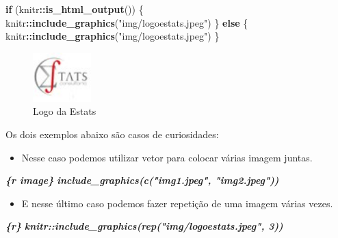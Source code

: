 \documentclass[
]{book}
\newenvironment{Shaded}{\begin{snugshade}}{\end{snugshade}}
\newcommand{\ControlFlowTok}[1]{\textcolor[rgb]{0.13,0.29,0.53}{\textbf{#1}}}
\newcommand{\InformationTok}[1]{\textcolor[rgb]{0.56,0.35,0.01}{\textbf{\textit{#1}}}}
\newcommand{\KeywordTok}[1]{\textcolor[rgb]{0.13,0.29,0.53}{\textbf{#1}}}
\newcommand{\NormalTok}[1]{#1}
\newcommand{\OperatorTok}[1]{\textcolor[rgb]{0.81,0.36,0.00}{\textbf{#1}}}
\newcommand{\StringTok}[1]{\textcolor[rgb]{0.31,0.60,0.02}{#1}}
\providecommand{\tightlist}{%
  \setlength{\itemsep}{0pt}\setlength{\parskip}{0pt}}
\begin{document}
\begin{Shaded}
\begin{Highlighting}[]
\ControlFlowTok{if}\NormalTok{ (knitr}\OperatorTok{::}\KeywordTok{is\_html\_output}\NormalTok{()) \{}
\NormalTok{    knitr}\OperatorTok{::}\KeywordTok{include\_graphics}\NormalTok{(}\StringTok{"img/logoestats.jpeg"}\NormalTok{)}
\NormalTok{\} }\ControlFlowTok{else}\NormalTok{ \{}
\NormalTok{    knitr}\OperatorTok{::}\KeywordTok{include\_graphics}\NormalTok{(}\StringTok{"img/logoestats.jpeg"}\NormalTok{)}
\NormalTok{\}}
\end{Highlighting}
\end{Shaded}

\begin{figure}[h]

{\centering \includegraphics[width=0.89in]{img/logoestats} 

}

\caption{Logo da Estats}\label{fig:unnamed-chunk-6}
\end{figure}

Os dois exemplos abaixo são casos de curiosidades:

\begin{itemize}
\tightlist
\item
  Nesse caso podemos utilizar vetor para colocar várias imagem juntas.
\end{itemize}

\begin{Shaded}
\begin{Highlighting}[]
\InformationTok{\textasciigrave{}\textasciigrave{}\textasciigrave{}\{r image\}}
\InformationTok{include\_graphics(c("img1.jpeg", "img2.jpeg"))}
\InformationTok{\textasciigrave{}\textasciigrave{}\textasciigrave{}}
\end{Highlighting}
\end{Shaded}

\begin{itemize}
\tightlist
\item
  E nesse último caso podemos fazer repetição de uma imagem várias vezes.
\end{itemize}

\begin{Shaded}
\begin{Highlighting}[]
\InformationTok{\textasciigrave{}\textasciigrave{}\textasciigrave{}\{r\}}
\InformationTok{knitr::include\_graphics(rep("img/logoestats.jpeg", 3))}
\InformationTok{\textasciigrave{}\textasciigrave{}\textasciigrave{}}
\end{Highlighting}
\end{Shaded}
\end{document}
